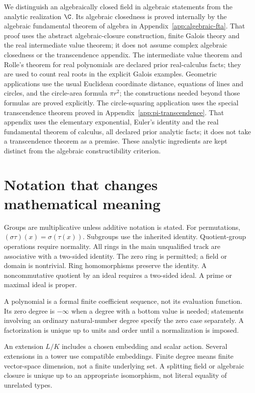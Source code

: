 We distinguish an algebraically closed field in algebraic statements from
the analytic realization $\C$. Its algebraic closedness is proved internally by the algebraic
fundamental theorem of algebra in Appendix~\ref{app:algebraic-fta}.
That proof uses the abstract algebraic-closure construction, finite Galois
theory and the real intermediate value theorem; it does not assume
complex algebraic closedness or the transcendence appendix. The intermediate value theorem and Rolle's
theorem for real polynomials are declared prior real-calculus facts;
they are used to count real roots in the explicit Galois examples.
Geometric applications use the usual Euclidean coordinate distance,
equations of lines and circles, and the circle-area formula $\pi r^2$;
the constructions needed beyond those formulas are proved explicitly.
The circle-squaring application uses the
special transcendence theorem proved in Appendix~\ref{app:pi-transcendence}.
That appendix uses the elementary exponential, Euler's identity and the
real fundamental theorem of calculus, all declared prior analytic facts;
it does not take a transcendence theorem as a premise. These analytic
ingredients are kept distinct from the algebraic constructibility criterion.

\section{Notation that changes mathematical meaning}
Groups are multiplicative unless additive notation is stated. For
permutations, $(\sigma\tau)(x)=\sigma(\tau(x))$. Subgroups use the
inherited identity. Quotient-group operations require normality.
All rings in the main unqualified track are associative with a two-sided
identity. The zero ring is permitted; a field or domain is nontrivial.
Ring homomorphisms preserve the identity. A noncommutative quotient by
an ideal requires a two-sided ideal. A prime or maximal ideal is proper.

A polynomial is a formal finite coefficient sequence, not its evaluation
function. Its zero degree is $-\infty$ when a degree with a bottom value
is needed; statements involving an ordinary natural-number degree specify
the zero case separately. A factorization is unique up to units and order
until a normalization is imposed.

An extension $L/K$ includes a chosen embedding and scalar action. Several
extensions in a tower use compatible embeddings. Finite degree means
finite vector-space dimension, not a finite underlying set. A splitting
field or algebraic closure is unique up to an appropriate isomorphism,
not literal equality of unrelated types.

